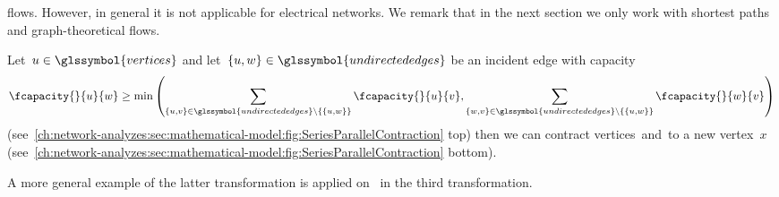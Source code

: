 flows. However, in general it is not applicable for electrical networks. We
remark that in the next section we only work with shortest paths and
graph-theoretical flows.
%
\begin{reductionrule}
    Let~$\vertexa\in\glssymbol{vertices}$ and let~$
    \{\vertexa,\vertexc\}\in\glssymbol{undirectededges}$ be an incident
    edge with capacity~$$
        \fcapacity{}{\vertexa}{\vertexc}
        \geq
        \min
        \left(
            \sum_{
                \{\vertexa,\vertexb\}
                \in
                \glssymbol{undirectededges}
                \setminus
                \{
                    \{\vertexa,\vertexc\}
                \}
            }
            \fcapacity{}{\vertexa}{\vertexb}, 
            \sum_{
                \{\vertexc,\vertexb\}
                \in
                \glssymbol{undirectededges}
                \setminus
                \{
                    \{\vertexa,\vertexc\}
                \}
            }
            \fcapacity{}{\vertexc}{\vertexb}
        \right)$$
    (see~\cref{ch:network-analyzes:sec:mathematical-model:fig:SeriesParallelContraction}
    top) then we can contract vertices~\vertexa and~\vertexb to a new
    vertex~$x$
    (see~\cref{ch:network-analyzes:sec:mathematical-model:fig:SeriesParallelContraction}
    bottom).
    \label{ch:network-analyzes:sec:mathematical-model:sim:edge_shortening}
\end{reductionrule}
% 
A more general example of the latter transformation is applied on~\parencite[p.
316; Figure 7]{Ake60} in the third transformation.

